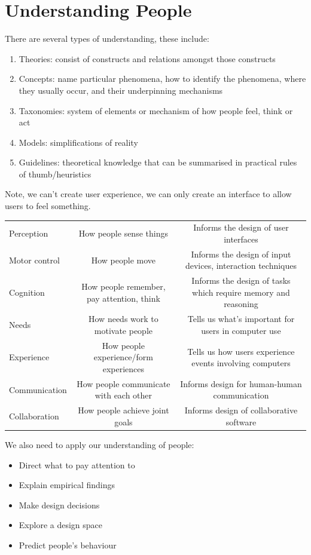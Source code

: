 \documentclass{article}
\begin{document}
\section{Understanding People}
There are several types of understanding, these include:
\begin{enumerate}
    \item Theories: consist of constructs and relations amongst those constructs
    \item Concepts: name particular phenomena, how to identify the phenomena, where they usually occur, and their underpinning mechanisms
    \item Taxonomies: system of elements or mechanism of how people feel, think or act
    \item Models: simplifications of reality
    \item Guidelines: theoretical knowledge that can be summarised in practical rules of thumb/heuristics
\end{enumerate}
Note, we can't create user experience, we can only create an interface to allow users to feel something. \\
\begin{center}
\begin{tabulary}{0.99\textwidth}{|p{2.5cm}|C|C|}
    \hline
{} &  &  \\ 
                    \hline
Perception & How people sense things & Informs the design of user interfaces  \\    \hline
Motor control & How people move & Informs the design of input devices, interaction techniques \\ \hline
Cognition & How people remember, pay attention, think & Informs the design of tasks which require memory and reasoning \\ \hline
Needs & How needs work to motivate people & Tells us what's important for users in computer use \\ \hline
Experience & How people experience/form experiences & Tells us how users experience events involving computers \\ \hline
Communication & How people communicate with each other & Informs design for human-human communication \\ \hline
Collaboration & How people achieve joint goals & Informs design of collaborative software \\ \hline
    \end{tabulary}
\end{center}
We also need to apply our understanding of people:
\begin{itemize}
    \item Direct what to pay attention to 
    \item Explain empirical findings
    \item Make design decisions
    \item Explore a design space
    \item Predict people's behaviour
\end{itemize}
\end{document}
